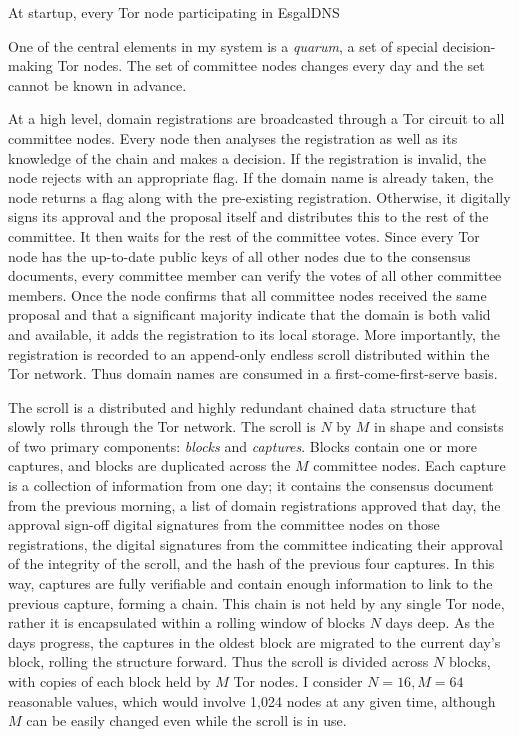 At startup, every Tor node participating in EsgalDNS 







One of the central elements in my system is a \textit{quarum}, a set of special decision-making Tor nodes. The set of committee nodes changes every day and the set cannot be known in advance. 

At a high level, domain registrations are broadcasted through a Tor circuit to all committee nodes. Every node then analyses the registration as well as its knowledge of the chain and makes a decision. If the registration is invalid, the node rejects with an appropriate flag. If the domain name is already taken, the node returns a flag along with the pre-existing registration. Otherwise, it digitally signs its approval and the proposal itself and distributes this to the rest of the committee. It then waits for the rest of the committee votes. Since every Tor node has the up-to-date public keys of all other nodes due to the consensus documents, every committee member can verify the votes of all other committee members. Once the node confirms that all committee nodes received the same proposal and that a significant majority indicate that the domain is both valid and available, it adds the registration to its local storage. More importantly, the registration is recorded to an append-only endless scroll distributed within the Tor network. Thus domain names are consumed in a first-come-first-serve basis.

The scroll is a distributed and highly redundant chained data structure that slowly rolls through the Tor network. The scroll is $ N $ by $ M $ in shape and consists of two primary components: \textit{blocks} and \textit{captures}. Blocks contain one or more captures, and blocks are duplicated across the $ M $ committee nodes. Each capture is a collection of information from one day; it contains the consensus document from the previous morning, a list of domain registrations approved that day, the approval sign-off digital signatures from the committee nodes on those registrations, the digital signatures from the committee indicating their approval of the integrity of the scroll, and the hash of the previous four captures. In this way, captures are fully verifiable and contain enough information to link to the previous capture, forming a chain. This chain is not held by any single Tor node, rather it is encapsulated within a rolling window of blocks $ N $ days deep. As the days progress, the captures in the oldest block are migrated to the current day's block, rolling the structure forward. Thus the scroll is divided across $ N $ blocks, with copies of each block held by $ M $ Tor nodes. I consider $ N = 16, M = 64 $ reasonable values, which would involve 1,024 nodes at any given time, although $ M $ can be easily changed even while the scroll is in use.


